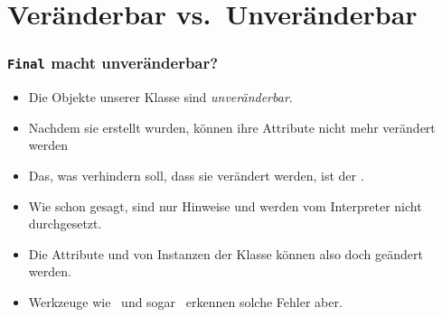 \documentclass[aspectratio=169,mathserif,notheorems]{beamer}%
\begin{document}
\section{Veränderbar vs.\ Unveränderbar}%
%
\begin{frame}%
\frametitle{\texttt{Final} macht unveränderbar?}%
%
\begin{itemize}%
\item Die Objekte unserer Klasse  sind \emph{unveränderbar}.%
%
\item<2-> Nachdem sie erstellt wurden, können ihre Attribute nicht mehr verändert werden%
%
\item<4-> Das, was verhindern soll, dass sie verändert werden, ist der  .%
%
\item<5-> Wie schon gesagt,  sind nur Hinweise und werden vom Interpreter nicht durchgesetzt\cite{PEP591}.%
%
\item<6-> Die Attribute  und  von Instanzen der Klasse  können also doch geändert werden.%
%
\item<7-> Werkzeuge wie \mypy\ und sogar \pycharm\ erkennen solche Fehler aber\cite{PEP591}.%
%
\end{itemize}%
%
\end{frame}%
%
\end{document}
